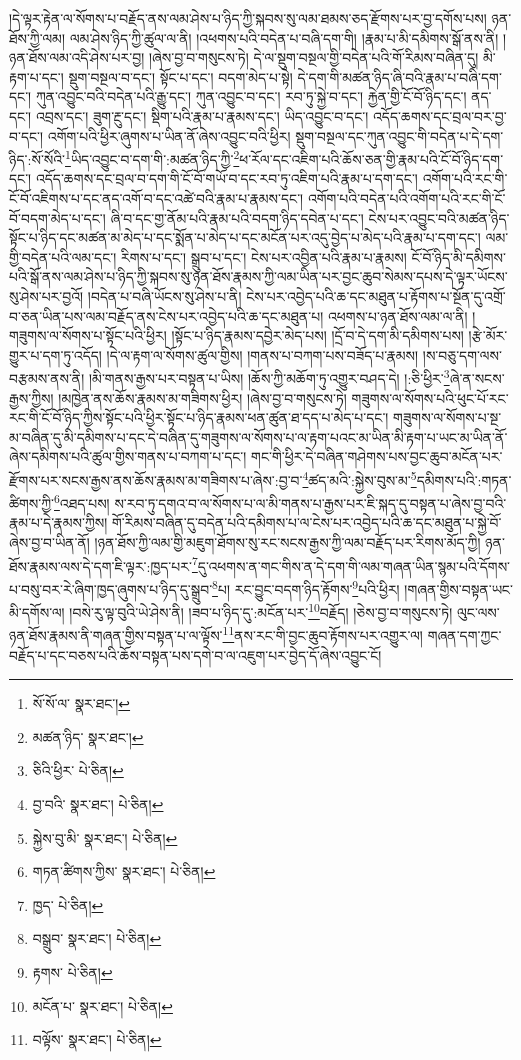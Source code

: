 །དེ་ལྟར་རྟེན་ལ་སོགས་པ་བརྗོད་ནས་ལམ་ཤེས་པ་ཉིད་ཀྱི་སྐབས་སུ་ལམ་ཐམས་ཅད་རྫོགས་པར་བྱ་དགོས་པས། ཉན་ཐོས་ཀྱི་ལམ། ལམ་ཤེས་ཉིད་ཀྱི་ཚུལ་ལ་ནི། །འཕགས་པའི་བདེན་པ་བཞི་དག་གི། །རྣམ་པ་མི་དམིགས་སྒོ་ནས་ནི། །ཉན་ཐོས་ལམ་འདི་ཤེས་པར་བྱ། །ཞེས་བྱ་བ་གསུངས་ཏེ། དེ་ལ་སྡུག་བསྔལ་གྱི་བདེན་པའི་གོ་རིམས་བཞིན་དུ། མི་རྟག་པ་དང་། སྡུག་བསྔལ་བ་དང་། སྟོང་པ་དང་། བདག་མེད་པ་སྟེ། དེ་དག་གི་མཚན་ཉིད་ཞི་བའི་རྣམ་པ་བཞི་དག་དང་། ཀུན་འབྱུང་བའི་བདེན་པའི་རྒྱུ་དང་། ཀུན་འབྱུང་བ་དང་། རབ་ཏུ་སྐྱེ་བ་དང་། རྐྱེན་གྱི་ངོ་བོ་ཉིད་དང་། ནད་དང་། འབྲས་དང་། ཟུག་རྔུ་དང་། སྡིག་པའི་རྣམ་པ་རྣམས་དང་། ཡིད་འབྱུང་བ་དང་། འདོད་ཆགས་དང་བྲལ་བར་བྱ་བ་དང་། འགོག་པའི་ཕྱིར་ཞུགས་པ་ཡིན་ནོ་ཞེས་འབྱུང་བའི་ཕྱིར། སྡུག་བསྔལ་དང་ཀུན་འབྱུང་གི་བདེན་པ་དེ་དག་ཉིད་:སོ་སོའི་\footnote{སོ་སོ་ལ་  སྣར་ཐང་། }ཡིད་འབྱུང་བ་དག་གི་:མཚན་ཉིད་ཀྱི་\footnote{མཚན་ཉིད་  སྣར་ཐང་། }ཕ་རོལ་དང་འཇིག་པའི་ཆོས་ཅན་གྱི་རྣམ་པའི་ངོ་བོ་ཉིད་དག་དང་། འདོད་ཆགས་དང་བྲལ་བ་དག་གི་ངོ་བོ་གཡོ་བ་དང་རབ་ཏུ་འཇིག་པའི་རྣམ་པ་དག་དང་། འགོག་པའི་རང་གི་ངོ་བོ་འཇིགས་པ་དང་ནད་འགོ་བ་དང་འཚེ་བའི་རྣམ་པ་རྣམས་དང་། འགོག་པའི་བདེན་པའི་འགོག་པའི་རང་གི་ངོ་བོ་བདག་མེད་པ་དང་། ཞི་བ་དང་གྱ་ནོམ་པའི་རྣམ་པའི་བདག་ཉིད་དབེན་པ་དང་། ངེས་པར་འབྱུང་བའི་མཚན་ཉིད་སྟོང་པ་ཉིད་དང་མཚན་མ་མེད་པ་དང་སྨོན་པ་མེད་པ་དང་མངོན་པར་འདུ་བྱེད་པ་མེད་པའི་རྣམ་པ་དག་དང་། ལམ་གྱི་བདེན་པའི་ལམ་དང་། རིགས་པ་དང་། སྒྲུབ་པ་དང་། ངེས་པར་འབྱིན་པའི་རྣམ་པ་རྣམས། ངོ་བོ་ཉིད་མི་དམིགས་པའི་སྒོ་ནས་ལམ་ཤེས་པ་ཉིད་ཀྱི་སྐབས་སུ་ཉན་ཐོས་རྣམས་ཀྱི་ལམ་ཡིན་པར་བྱང་ཆུབ་སེམས་དཔས་དེ་ལྟར་ཡོངས་སུ་ཤེས་པར་བྱའོ། །བདེན་པ་བཞི་ཡོངས་སུ་ཤེས་པ་ནི། ངེས་པར་འབྱེད་པའི་ཆ་དང་མཐུན་པ་རྟོགས་པ་སྔོན་དུ་འགྲོ་བ་ཅན་ཡིན་པས་ལམ་བརྗོད་ནས་ངེས་པར་འབྱེད་པའི་ཆ་དང་མཐུན་པ། འཕགས་པ་ཉན་ཐོས་ལམ་ལ་ནི། །གཟུགས་ལ་སོགས་པ་སྟོང་པའི་ཕྱིར། །སྟོང་པ་ཉིད་རྣམས་དབྱེར་མེད་པས། །དྲོ་བ་དེ་དག་མི་དམིགས་པས། །རྩེ་མོར་གྱུར་པ་དག་ཏུ་འདོད། །དེ་ལ་རྟག་ལ་སོགས་ཚུལ་གྱིས། །གནས་པ་བཀག་པས་བཟོད་པ་རྣམས། །ས་བཅུ་དག་ལས་བརྩམས་ནས་ནི། །མི་གནས་རྒྱས་པར་བསྟན་པ་ཡིས། །ཆོས་ཀྱི་མཆོག་ཏུ་འགྱུར་བཤད་དེ། །:ཅི་ཕྱིར་\footnote{ཅིའི་ཕྱིར་  པེ་ཅིན། }ཞེ་ན་སངས་རྒྱས་ཀྱིས། །མཁྱེན་ནས་ཆོས་རྣམས་མ་གཟིགས་ཕྱིར། །ཞེས་བྱ་བ་གསུངས་ཏེ། གཟུགས་ལ་སོགས་པའི་ཕུང་པོ་རང་རང་གི་ངོ་བོ་ཉིད་ཀྱིས་སྟོང་པའི་ཕྱིར་སྟོང་པ་ཉིད་རྣམས་ཕན་ཚུན་ཐ་དད་པ་མེད་པ་དང་། གཟུགས་ལ་སོགས་པ་སྔ་མ་བཞིན་དུ་མི་དམིགས་པ་དང་དེ་བཞིན་དུ་གཟུགས་ལ་སོགས་པ་ལ་རྟག་པའང་མ་ཡིན་མི་རྟག་པ་ཡང་མ་ཡིན་ནོ་ཞེས་དམིགས་པའི་ཚུལ་གྱིས་གནས་པ་བཀག་པ་དང་། གང་གི་ཕྱིར་དེ་བཞིན་གཤེགས་པས་བྱང་ཆུབ་མངོན་པར་རྫོགས་པར་སངས་རྒྱས་ནས་ཆོས་རྣམས་མ་གཟིགས་པ་ཞེས་:བྱ་བ་\footnote{བྱ་བའི་  སྣར་ཐང་།  པེ་ཅིན། }ཚད་མའི་:སྐྱེས་བུས་མ་\footnote{སྐྱེས་བུ་མི་  སྣར་ཐང་།  པེ་ཅིན། }དམིགས་པའི་:གཏན་ཚིགས་ཀྱི་\footnote{གཏན་ཚིགས་ཀྱིས་  སྣར་ཐང་།  པེ་ཅིན། }འཐད་པས། ས་རབ་ཏུ་དགའ་བ་ལ་སོགས་པ་ལ་མི་གནས་པ་རྒྱས་པར་ཇི་སྐད་དུ་བསྟན་པ་ཞེས་བྱ་བའི་རྣམ་པ་དེ་རྣམས་ཀྱིས། གོ་རིམས་བཞིན་དུ་བདེན་པའི་དམིགས་པ་ལ་ངེས་པར་འབྱེད་པའི་ཆ་དང་མཐུན་པ་སྐྱེ་བོ་ཞེས་བྱ་བ་ཡིན་ནོ། །ཉན་ཐོས་ཀྱི་ལམ་གྱི་མཇུག་ཐོགས་སུ་རང་སངས་རྒྱས་ཀྱི་ལམ་བརྗོད་པར་རིགས་མོད་ཀྱི། ཉན་ཐོས་རྣམས་ལས་དེ་དག་ཇི་ལྟར་:ཁྱད་པར་\footnote{ཁྱད་  པེ་ཅིན། }དུ་འཕགས་ན་གང་གིས་ན་དེ་དག་གི་ལམ་གཞན་ཡིན་སྙམ་པའི་དོགས་པ་བསུ་བར་རེ་ཞིག་ཁྱད་ཞུགས་པ་ཉིད་དུ་སྒྲུབ་\footnote{བསྒྲུབ་  སྣར་ཐང་།  པེ་ཅིན། }པ། རང་བྱུང་བདག་ཉིད་རྟོགས་\footnote{རྟགས་  པེ་ཅིན། }པའི་ཕྱིར། །གཞན་གྱིས་བསྟན་ཡང་མི་དགོས་ལ། །བསེ་རུ་ལྟ་བུའི་ཡེ་ཤེས་ནི། །ཟབ་པ་ཉིད་དུ་:མངོན་པར་\footnote{མངོན་པ་  སྣར་ཐང་།  པེ་ཅིན། }བརྗོད། །ཅེས་བྱ་བ་གསུངས་ཏེ། ལུང་ལས་ཉན་ཐོས་རྣམས་ནི་གཞན་གྱིས་བསྟན་པ་ལ་ལྟོས་\footnote{བལྟོས་  སྣར་ཐང་།  པེ་ཅིན། }ནས་རང་གི་བྱང་ཆུབ་རྟོགས་པར་འགྱུར་ལ། གཞན་དག་ཀྱང་བརྗོད་པ་དང་བཅས་པའི་ཆོས་བསྟན་པས་དགེ་བ་ལ་འཇུག་པར་བྱེད་དོ་ཞེས་འབྱུང་ངོ། 